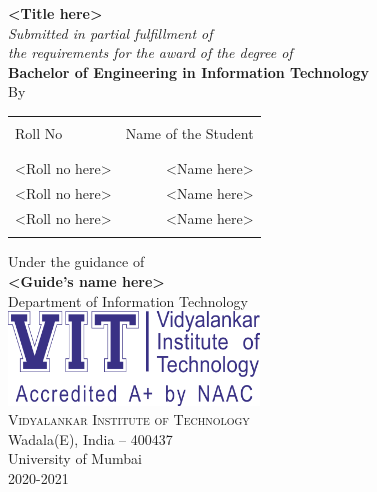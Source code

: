 \begin{titlepage}
       \begin{center}
              \Large \textbf {<Title here>}\\[0.5cm]
              \small \emph{Submitted in partial fulfillment of\\
                     the requirements for the award of the degree of}\\[0.2cm]
              {\bf Bachelor of Engineering in Information Technology}\\[0.5cm]

              By \\
              \begin{table}[h]
                     \centering
                     \begin{tabular}{lr}\hline                           \\
                            Roll No        & Name of the Student \\ \\ \hline
                            \\
                            <Roll no here> & <Name here>         \\
                            <Roll no here> & <Name here>         \\
                            <Roll no here> & <Name here>         \\ \\ \hline
                     \end{tabular}
              \end{table}

              \vspace{0.5cm}

              Under the guidance of\\[0.2cm]
              {\textbf{<Guide's name here>}}\\[0.5cm]

              \Large{Department of Information Technology}\\[0.5cm]
              \includegraphics[width=0.50\textwidth]{./vit-logo.png}\\[0.5cm]
              \normalsize \textsc{Vidyalankar Institute of Technology}\\
              Wadala(E), India -- 400437\\[0.5cm]
              \large{University of Mumbai\\
                     2020-2021}
       \end{center}
\end{titlepage}
